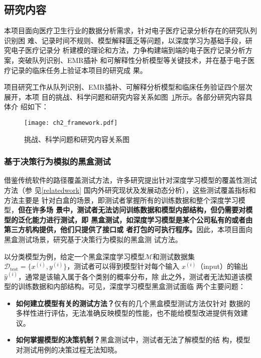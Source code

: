 \subsection{研究内容}\label{ch2content}

本项目面向医疗卫生行业的数据分析需求，针对电子医疗记录分析存在的研究队列识别困
难、记录时间不规则、模型解释匮乏等问题，以深度学习为基础手段，研究电子医疗记录分
析建模的理论和方法，力争构建端到端的电子医疗记录分析方案，突破队列识别、EMR插补
和可解释性分析模型等关键技术，并在基于电子医疗记录的临床任务上验证本项目的研究成
果。

项目研究工作从队列识别、EMR插补、可解释分析模型和临床任务验证四个层次展开，本项
目的挑战、科学问题和研究内容关系如图~\ref{fig:ch2:rc}所示。各部分研究内容具体介
绍如下：

\begin{figure}[htp]
    \begin{small}
        \begin{center}
            \texttt{[image: ch2\_framework.pdf]}
        \end{center}
        \caption{挑战、科学问题和研究内容关系图}
        \label{fig:ch2:rc}
    \end{small}
\end{figure}

\subsubsection{基于决策行为模拟的黑盒测试}

借鉴传统软件的路径覆盖测试方法，许多研究提出针对深度学习模型的覆盖性测试方法（参
见\ref{relatedwork} 国内外研究现状及发展动态分析），这些测试覆盖指标和方法主要是
针对白盒的场景，即测试者掌握所有的训练数据和整个深度学习模型，\textbf{但在许多场
景中，测试者无法访问训练数据和模型内部结构，但仍需要对模型的泛化能力进行测试，即
黑盒测试，如深度学习模型是某个公司私有的或者由第三方机构提供，他们只提供了接口或
者打包的可执行程序。}因此，本项目面向黑盒测试场景，研究基于决策行为模拟的黑盒测
试方法。

以分类模型为例，给定一个黑盒深度学习模型$\mathcal M$和测试数据集$\mathcal
D_{\text{test}}=\{x^{(i)},y^{(i)}\}$，测试者可以得到模型针对每个输入
$x^{(i)}$（input）的输出$\hat{y}^{(i)}$，通常是该输入属于各个类别的概率分布，除
此之外，测试者无法知道该模型的训练数据和内部结构。可见，深度学习模型黑盒测试面临
两个主要问题：
\begin{itemize}
    \item \textbf{如何建立模型有关的测试方法？}仅有的几个黑盒模型测试方法仅针对
    数据的多样性进行评估，无法准确反映模型的性能，也不能给模型改进提供有效建议。
    \item \textbf{如何掌握模型的决策机制？}黑盒测试中，测试者无法了解模型的结
    构，模型对测试用例的决策过程无法知晓。
\end{itemize}


